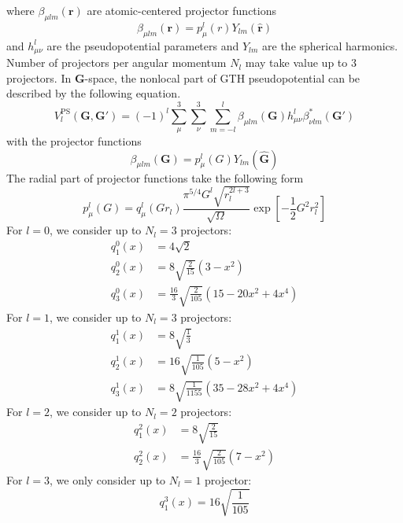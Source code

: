 where $\beta_{\mu lm}(\mathbf{r})$ are atomic-centered projector functions
\begin{equation}
\beta_{\mu lm}(\mathbf{r}) = 
p^{l}_{\mu}(r) Y_{lm}(\hat{\mathbf{r}})
\label{eq:proj_NL_R}
\end{equation}
%
and $h^{l}_{\mu\nu}$ are the pseudopotential parameters and
$Y_{lm}$ are the spherical harmonics. Number of projectors per angular
momentum $N_{l}$ may take value up to 3 projectors.
%
In $\mathbf{G}$-space, the nonlocal part of GTH pseudopotential can be described by
the following equation.
\begin{equation}
V^{\mathrm{PS}}_{l}(\mathbf{G},\mathbf{G}') =
(-1)^{l} \sum_{\mu}^{3} \sum_{\nu}^{3}\sum_{m=-l}^{l}
\beta_{\mu l m}(\mathbf{G}) h^{l}_{\mu\nu}
\beta^{*}_{\nu l m}(\mathbf{G}')
\end{equation}
with the projector functions
\begin{equation}
\beta_{\mu lm}(\mathbf{G}) = p^{l}_{\mu}(G) Y_{lm}(\hat{\mathbf{G}})
\label{eq:betaNL_G}
\end{equation}
The radial part of projector functions take the following form
\begin{equation}
p^{l}_{\mu}(G) = q^{l}_{\mu}\left(Gr_{l}\right)
\frac{\pi^{5/4}G^{l}\sqrt{ r_{l}^{2l+3}}}{\sqrt{\Omega}}
\exp\left[-\frac{1}{2}G^{2}r^{2}_{l}\right]
\label{eq:proj_NL_G}
\end{equation}
%
For $l=0$, we consider up to $N_{l}=3$ projectors:
\begin{align}
q^{0}_{1}(x) & = 4\sqrt{2} \\
q^{0}_{2}(x) & = 8\sqrt{\frac{2}{15}}(3 - x^2) \\
q^{0}_{3}(x) & = \frac{16}{3}\sqrt{\frac{2}{105}} (15 - 20x^2 + 4x^4)
\end{align}
%
For $l=1$, we consider up to $N_{l}=3$ projectors:
\begin{align}
q^{1}_{1}(x) & = 8 \sqrt{\frac{1}{3}} \\
q^{1}_{2}(x) & = 16 \sqrt{\frac{1}{105}} (5 - x^2) \\
q^{1}_{3}(x) & = 8 \sqrt{\frac{1}{1155}} (35 - 28x^2 + 4x^4)
\end{align}
%
For $l=2$, we consider up to $N_{l}=2$ projectors:
\begin{align}
q^{2}_{1}(x) & = 8\sqrt{\frac{2}{15}} \\
q^{2}_{2}(x) & = \frac{16}{3} \sqrt{\frac{2}{105}}(7 - x^2)
\end{align}
%
For $l=3$, we only consider up to $N_{l}=1$ projector:
\begin{equation}
q^{3}_{1}(x) = 16\sqrt{\frac{1}{105}}
\end{equation}

